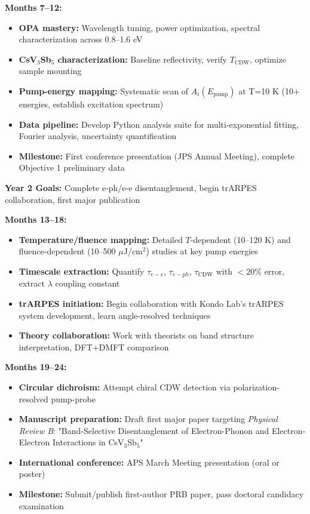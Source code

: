 \documentclass[12pt,a4paper]{article}
\begin{document}
\textbf{Months 7--12:}
\begin{itemize}
    \item \textbf{OPA mastery:} Wavelength tuning, power optimization, spectral characterization across 0.8--1.6 eV
    \item \textbf{CsV$_3$Sb$_5$ characterization:} Baseline reflectivity, verify $T_{\text{CDW}}$, optimize sample mounting
    \item \textbf{Pump-energy mapping:} Systematic scan of $A_i(E_{\text{pump}})$ at T=10 K (10+ energies, establish excitation spectrum)
    \item \textbf{Data pipeline:} Develop Python analysis suite for multi-exponential fitting, Fourier analysis, uncertainty quantification
    \item \textbf{Milestone:} First conference presentation (JPS Annual Meeting), complete Objective 1 preliminary data
\end{itemize}

\textbf{Year 2 Goals:} Complete e-ph/e-e disentanglement, begin trARPES collaboration, first major publication

\textbf{Months 13--18:}
\begin{itemize}
    \item \textbf{Temperature/fluence mapping:} Detailed $T$-dependent (10--120 K) and fluence-dependent (10--500 $\mu$J/cm$^2$) studies at key pump energies
    \item \textbf{Timescale extraction:} Quantify $\tau_{e-e}$, $\tau_{e-ph}$, $\tau_{\text{CDW}}$ with $<20\%$ error, extract $\lambda$ coupling constant
    \item \textbf{trARPES initiation:} Begin collaboration with Kondo Lab's trARPES system development, learn angle-resolved techniques
    \item \textbf{Theory collaboration:} Work with theorists on band structure interpretation, DFT+DMFT comparison
\end{itemize}

\textbf{Months 19--24:}
\begin{itemize}
    \item \textbf{Circular dichroism:} Attempt chiral CDW detection via polarization-resolved pump-probe
    \item \textbf{Manuscript preparation:} Draft first major paper targeting \textit{Physical Review B}: "Band-Selective Disentanglement of Electron-Phonon and Electron-Electron Interactions in CsV$_3$Sb$_5$"
    \item \textbf{International conference:} APS March Meeting presentation (oral or poster)
    \item \textbf{Milestone:} Submit/publish first-author PRB paper, pass doctoral candidacy examination
\end{itemize}
\end{document}
